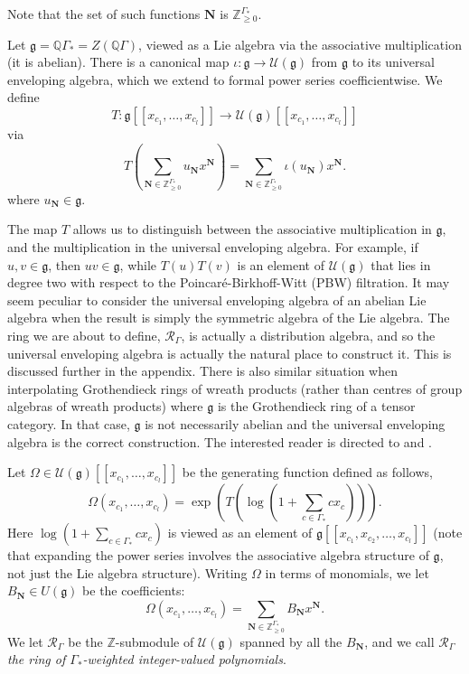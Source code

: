 \documentclass[ALCO,Unicode]{cedram}
\newcommand{\RGamma}{\mathcal{R}_{\Gamma}}
\newcommand{\RGamma}{\mathcal{R}_{\Gamma}}
\begin{document}
Note that the set of such functions $\mathbf{N}$ is $\mathbb{Z}_{\geq 0}^{\Gamma_*}$. 
\begin{definition}
Let $\mathfrak{g} = \mathbb{Q}\Gamma_* = Z(\mathbb{Q}\Gamma)$, viewed as a Lie algebra via the associative multiplication \textup{(}it is abelian\textup{)}. There is a canonical map $\iota: \mathfrak{g} \to \mathcal{U}(\mathfrak{g})$ from $\mathfrak{g}$ to its universal enveloping algebra, which we extend to formal power series coefficientwise. We define
\[
T: \mathfrak{g}[[x_{c_1}, \ldots, x_{c_l}]] \to \mathcal{U}(\mathfrak{g})[[x_{c_1},  \ldots, x_{c_l}]]
\]
via
\[
T\left(
\sum_{\mathbf{N} \in \mathbb{Z}_{\geq 0}^{\Gamma_*}} u_{\mathbf{N}} x^{\mathbf{N}}
\right) = \sum_{\mathbf{N} \in \mathbb{Z}_{\geq 0}^{\Gamma_*}} \iota(u_{\mathbf{N}}) x^{\mathbf{N}}.
\]
where $u_{\mathbf{N}} \in \mathfrak{g}$.
\end{definition}
\begin{remark}
The map $T$ allows us to distinguish between the associative multiplication in $\mathfrak{g}$, and the multiplication in the universal enveloping algebra. For example, if $u, v \in \mathfrak{g}$, then $uv \in \mathfrak{g}$, while $T(u)T(v)$ is an element of $\mathcal{U}(\mathfrak{g})$ that lies in degree two with respect to the Poincar\'{e}-Birkhoff-Witt (PBW) filtration. It may seem peculiar to consider the universal enveloping algebra of an abelian Lie algebra when the result is simply the symmetric algebra of the Lie algebra. The ring we are about to define, $\RGamma$, is actually a distribution algebra, and so the universal enveloping algebra is actually the natural place to construct it. This is discussed further in the appendix. There is also similar situation when interpolating Grothendieck rings of wreath products (rather than centres of group algebras of wreath products) where $\mathfrak{g}$ is the Grothendieck ring of a tensor category. In that case, $\mathfrak{g}$ is not necessarily abelian and the universal enveloping algebra is the correct construction. The interested reader is directed to \cite{Ryba1} and \cite{Ryba2}.
\end{remark}
\begin{definition} \label{rgamma_constr_defn}
Let $\Omega \in \mathcal{U}(\mathfrak{g})[[x_{c_1}, \ldots, x_{c_l}]]$ be the generating function defined as follows,
\[
\Omega(x_{c_1}, \ldots, x_{c_l}) = \exp\left(T\left(\log\left(1 + \sum_{c \in \Gamma_*} c x_c\right)\right)\right).
\]
Here $\log\left(1 + \sum_{c \in \Gamma_*} c x_c\right)$ is viewed as an element of $\mathfrak{g}[[x_{c_1}, x_{c_2}, \ldots, x_{c_l}]]$ \textup{(}note that expanding the power series involves the associative algebra structure of $\mathfrak{g}$, not just the Lie algebra structure\textup{)}. Writing $\Omega$ in terms of monomials, we let $B_{\mathbf{N}} \in U(\mathfrak{g})$ be the coefficients:
\[
\Omega(x_{c_1}, \ldots, x_{c_l}) = \sum_{\mathbf{N} \in \mathbb{Z}_{\geq 0}^{\Gamma_*}} B_{\mathbf{N}} x^{\mathbf{N}}.
\]
We let $\RGamma$ be the $\mathbb{Z}$-submodule of $\mathcal{U}(\mathfrak{g})$ spanned by all the $B_{\mathbf{N}}$, and we call $\RGamma$ \emph{the ring of $\Gamma_*$-weighted integer-valued polynomials}.
\end{definition}
\end{document}
